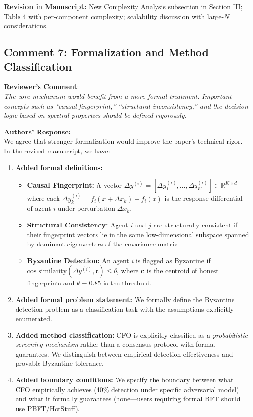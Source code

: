 \documentclass[11pt,a4paper]{article}
\newcommand{\reviewercomment}[1]{%
  \vspace{6pt}\noindent\textbf{\textcolor{reviewercolor}{Reviewer's Comment:}}\\
  \textcolor{reviewercolor}{\itshape #1}\vspace{4pt}}
\newcommand{\response}[1]{%
  \noindent\textbf{\textcolor{responsecolor}{Authors' Response:}}\\
  #1\vspace{8pt}}
\newcommand{\revision}[1]{%
  \noindent\textbf{Revision in Manuscript:} #1\vspace{4pt}}
\begin{document}
\revision{New Complexity Analysis subsection in Section III; Table 4 with per-component complexity; scalability discussion with large-$N$ considerations.}

\subsection*{Comment 7: Formalization and Method Classification}

\reviewercomment{The core mechanism would benefit from a more formal treatment. Important concepts such as ``causal fingerprint,'' ``structural inconsistency,'' and the decision logic based on spectral properties should be defined rigorously.}

\response{We agree that stronger formalization would improve the paper's technical rigor. In the revised manuscript, we have:

\begin{enumerate}[nosep]
\item \textbf{Added formal definitions:}
\begin{itemize}[nosep]
\item \textbf{Causal Fingerprint:} A vector $\Delta y^{(i)} = [\Delta y_1^{(i)}, \dots, \Delta y_K^{(i)}] \in \mathbb{R}^{K \times d}$ where each $\Delta y_k^{(i)} = f_i(x + \Delta x_k) - f_i(x)$ is the response differential of agent $i$ under perturbation $\Delta x_k$.
\item \textbf{Structural Consistency:} Agent $i$ and $j$ are structurally consistent if their fingerprint vectors lie in the same low-dimensional subspace spanned by dominant eigenvectors of the covariance matrix.
\item \textbf{Byzantine Detection:} An agent $i$ is flagged as Byzantine if $\text{cos\_similarity}(\Delta y^{(i)}, \mathbf{c}) \leq \theta$, where $\mathbf{c}$ is the centroid of honest fingerprints and $\theta=0.85$ is the threshold.
\end{itemize}

\item \textbf{Added formal problem statement:} We formally define the Byzantine detection problem as a classification task with the assumptions explicitly enumerated.

\item \textbf{Added method classification:} CFO is explicitly classified as a \textit{probabilistic screening mechanism} rather than a consensus protocol with formal guarantees. We distinguish between empirical detection effectiveness and provable Byzantine tolerance.

\item \textbf{Added boundary conditions:} We specify the boundary between what CFO empirically achieves (40\% detection under specific adversarial model) and what it formally guarantees (none---users requiring formal BFT should use PBFT/HotStuff).
\end{enumerate}}
\end{document}
